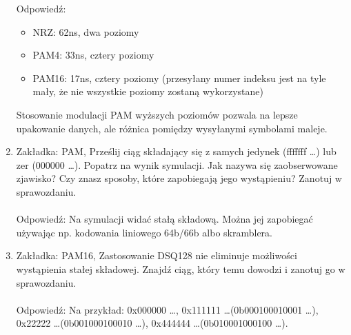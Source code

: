 \begin{enumerate}
    Odpowiedź:
    \begin{itemize}
        \item NRZ: 62ns, dwa poziomy
        \item PAM4: 33ns, cztery poziomy
        \item PAM16: 17ns, cztery poziomy (przesyłany numer indeksu jest na tyle mały, że nie wszystkie poziomy zostaną wykorzystane)
    \end{itemize} 
    Stosowanie modulacji PAM wyższych poziomów pozwala na lepsze upakowanie danych, ale różnica pomiędzy wysyłanymi symbolami maleje.
    \item Zakładka: PAM, Prześlij ciąg składający się z samych jedynek (fffffff \dots) lub zer (000000 \dots). Popatrz na wynik symulacji. Jak nazywa się zaobserwowane zjawisko? Czy znasz sposoby,
    które zapobiegają jego wystąpieniu? Zanotuj w sprawozdaniu. \\ \\
    Odpowiedź: Na symulacji widać stałą składową. Można jej zapobiegać używając np. kodowania liniowego 64b/66b albo skramblera.
    \item Zakładka: PAM16, Zastosowanie DSQ128 nie eliminuje możliwości wystąpienia stałej składowej. Znajdź ciąg, który
    temu dowodzi i zanotuj go w sprawozdaniu. \\ \\
    Odpowiedź: Na przykład: 0x000000 \dots, 0x111111 \dots (0b000100010001 \dots),\\0x22222 \dots (0b001000100010 \dots),
    0x444444 \dots (0b010001000100 \dots).
\end{enumerate}
